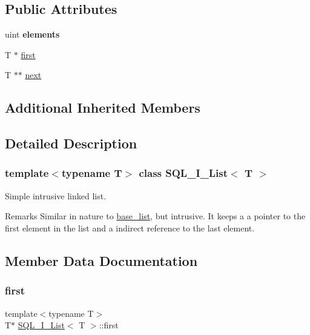 \subsection*{Public Attributes}
\begin{DoxyCompactItemize}
\item 
\mbox{\label{classSQL__I__List_a479a62a37484f593bf24cf93d3cb9389}} 
uint {\bfseries elements}
\item 
T $\ast$ \mbox{\hyperlink{classSQL__I__List_a32fbd6fa95e47ab0cd1f17ad902133ff}{first}}
\item 
T $\ast$$\ast$ \mbox{\hyperlink{classSQL__I__List_a73dfc554232c8d15637767d2c61b7578}{next}}
\end{DoxyCompactItemize}
\subsection*{Additional Inherited Members}


\subsection{Detailed Description}
\subsubsection*{template$<$typename T$>$\newline
class S\+Q\+L\+\_\+\+I\+\_\+\+List$<$ T $>$}

Simple intrusive linked list.

\begin{DoxyRemark}{Remarks}
Similar in nature to \mbox{\hyperlink{classbase__list}{base\+\_\+list}}, but intrusive. It keeps a a pointer to the first element in the list and a indirect reference to the last element. 
\end{DoxyRemark}


\subsection{Member Data Documentation}
\mbox{\label{classSQL__I__List_a32fbd6fa95e47ab0cd1f17ad902133ff}} 
\subsubsection{\texorpdfstring{first}{first}}
{\footnotesize\ttfamily template$<$typename T$>$ \\
T$\ast$ \mbox{\hyperlink{classSQL__I__List}{S\+Q\+L\+\_\+\+I\+\_\+\+List}}$<$ T $>$\+::first}


